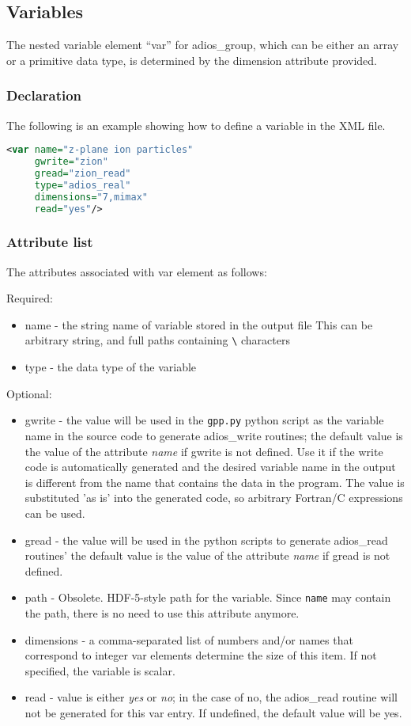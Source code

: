 \subsection{Variables}
\label{section-xml-variables}
The nested variable element ``var'' for adios\_group, which can be either an array 
or a primitive data type, is determined by the dimension attribute provided. 

\subsubsection{Declaration}

The following is an example showing how to define a variable in the XML file. 
\begin{lstlisting}[language=XML]
<var name="z-plane ion particles"
     gwrite="zion" 
     gread="zion_read" 
     type="adios_real" 
     dimensions="7,mimax" 
     read="yes"/>
\end{lstlisting}

\subsubsection{Attribute list}
The attributes associated with var element  as follows: 

Required:
\begin{itemize}
\item name - the string name of variable stored in the output file
This can be arbitrary string, and full paths containing \verb+\+ characters
\item type - the data type of the variable
\end{itemize}

Optional: 
\begin{itemize}
\item gwrite - the value will be used in the \verb+gpp.py+ python script as the 
variable name in the source code to generate adios\_write 
routines; the default value is the value of the attribute \textit{name} if gwrite 
is not defined. Use it if the write code is automatically generated and the desired
variable name in the output is different from the name that contains the data in the
program. The value is substituted 'as is' into the generated code, so arbitrary
Fortran/C expressions can be used. 
\item gread - the value will be used in the python scripts to generate adios\_read routines' 
the default value is the value of the attribute \textit{name} if  gread is not 
defined.
\item path - Obsolete. HDF-5-style path for the variable.  Since \verb+name+ may contain the path, 
there is no need to use this attribute anymore.
\item dimensions - a comma-separated list of numbers and/or names that correspond to 
integer var elements determine the size of this item. If not specified, the variable 
is scalar.
\item read - value is either \textit{yes} or \textit{no}; in the case of no, the adios\_read 
routine will not be generated for this var entry. If undefined, the default value 
will be yes. 
\end{itemize}

